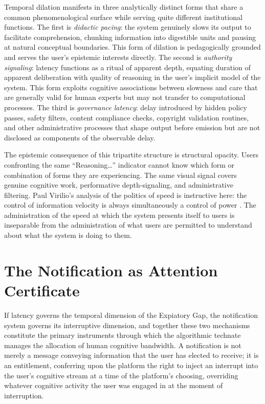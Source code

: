 \documentclass[12pt]{article}
\begin{document}
Temporal dilation manifests in three analytically distinct forms that share a common phenomenological surface while serving quite different institutional functions. The first is \emph{didactic pacing}: the system genuinely slows its output to facilitate comprehension, chunking information into digestible units and pausing at natural conceptual boundaries. This form of dilation is pedagogically grounded and serves the user's epistemic interests directly. The second is \emph{authority signaling}: latency functions as a ritual of apparent depth, equating duration of apparent deliberation with quality of reasoning in the user's implicit model of the system. This form exploits cognitive associations between slowness and care that are generally valid for human experts but may not transfer to computational processes. The third is \emph{governance latency}: delay introduced by hidden policy passes, safety filters, content compliance checks, copyright validation routines, and other administrative processes that shape output before emission but are not disclosed as components of the observable delay.

The epistemic consequence of this tripartite structure is structural opacity. Users confronting the same ``Reasoning\ldots'' indicator cannot know which form or combination of forms they are experiencing. The same visual signal covers genuine cognitive work, performative depth-signaling, and administrative filtering. Paul Virilio's analysis of the politics of speed is instructive here: the control of information velocity is always simultaneously a control of power \citep{Virilio1986}. The administration of the speed at which the system presents itself to users is inseparable from the administration of what users are permitted to understand about what the system is doing to them.

\section{The Notification as Attention Certificate}

If latency governs the temporal dimension of the Expiatory Gap, the notification system governs its interruptive dimension, and together these two mechanisms constitute the primary instruments through which the algorithmic technate manages the allocation of human cognitive bandwidth. A notification is not merely a message conveying information that the user has elected to receive; it is an entitlement, conferring upon the platform the right to inject an interrupt into the user's cognitive stream at a time of the platform's choosing, overriding whatever cognitive activity the user was engaged in at the moment of interruption.
\end{document}
